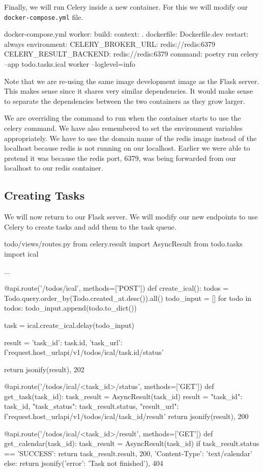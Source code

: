 \documentclass{csse4400}
\begin{document}
Finally, we will run Celery inside a new container.
For this we will modify our \texttt{docker-compose.yml} file.
%
\begin{code}[numbers=none]{docker-compose.yml}
  worker:
    build:
      context: .
      dockerfile: Dockerfile.dev
    restart: always
    environment:
      CELERY_BROKER_URL: redis://redis:6379
      CELERY_RESULT_BACKEND: redis://redis:6379
    command: poetry run celery --app todo.tasks.ical worker --loglevel=info
\end{code}

Note that we are re-using the same image development image as the Flask server.
This makes sense since it shares very similar dependencies.
It would make sense to separate the dependencies between the two containers as they grow larger.

We are overriding the command to run when the container starts to use the celery command.
We have also remembered to set the environment variables appropriately.
We have to use the domain name of the redis image instead of the localhost because redis is not running on our localhost.
Earlier we were able to pretend it was because the redis port, 6379, was being forwarded from our localhost to our redis container.

\subsection{Creating Tasks}

We will now return to our Flask server.
We will modify our new endpoints to use Celery to create tasks and add them to the task queue.
%
\begin{code}[language=python,numbers=none]{todo/views/routes.py}
from celery.result import AsyncResult
from todo.tasks import ical

...

@api.route('/todos/ical', methods=['POST'])
def create_ical():
    todos = Todo.query.order_by(Todo.created_at.desc()).all()
    todo_input = []
    for todo in todos:
        todo_input.append(todo.to_dict())

    task = ical.create_ical.delay(todo_input)

    result = {
        'task_id': task.id,
        'task_url': f'{request.host_url}api/v1/todos/ical/{task.id}/status'
    }

    return jsonify(result), 202

@api.route('/todos/ical/<task_id>/status', methods=['GET'])
def get_task(task_id):
    task_result = AsyncResult(task_id)
    result = {
        "task_id": task_id,
        "task_status": task_result.status,
        "result_url": f'{request.host_url}api/v1/todos/ical/{task_id}/result'
    }
    return jsonify(result), 200

@api.route('/todos/ical/<task_id>/result', methods=['GET'])
def get_calendar(task_id):
    task_result = AsyncResult(task_id)
    if task_result.status == 'SUCCESS':
        return task_result.result, 200, {'Content-Type': 'text/calendar'}
    else:
        return jsonify({'error': 'Task not finished'}), 404
\end{code}
\end{document}
